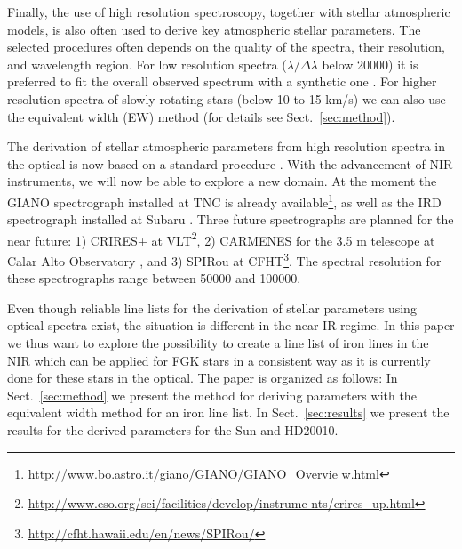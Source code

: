 \documentclass{aa}
\begin{document}
Finally, the use of high resolution spectroscopy, together with stellar
atmospheric models, is also often used to derive key atmospheric stellar
parameters. The selected procedures often depends on the quality of the
spectra, their resolution, and wavelength region. For low resolution
spectra ($\lambda/\Delta\lambda$ below 20000) it is preferred to
fit the overall observed spectrum with a synthetic one \citep[see
e.g.][]{Recio2006}. For higher resolution spectra of slowly rotating
stars (below 10 to 15 \si{km/s}) we can also use the equivalent width (EW)
method (for details see Sect.~\ref{sec:method}).

The derivation of stellar atmospheric parameters from high resolution spectra in the
optical is now based on a standard procedure \citep[see e.g.][]{Valenti2005,Sousa2008a}. With the
advancement of NIR instruments, we will now be able to explore a new
domain. At the moment the GIANO spectrograph installed at TNC is already
available\footnote{\url{http://www.bo.astro.it/giano/GIANO/GIANO_Overvie
w.html}}, as well as the IRD spectrograph installed
at Subaru \citep{IRD}. Three future spectrographs
are planned for the near future: 1) CRIRES+ at
VLT\footnote{\url{http://www.eso.org/sci/facilities/develop/instrume
nts/crires_up.html}}, 2) CARMENES for the 3.5 m telescope at
Calar Alto Observatory \citep{CARMENES}, and 3) SPIRou at
CFHT\footnote{\url{http://cfht.hawaii.edu/en/news/SPIRou/}}. The
spectral resolution for these spectrographs range between 50000 and
100000.

Even though reliable line lists for the derivation of stellar
parameters using optical spectra exist, the situation is different
in the near-IR regime. In this paper we thus want to explore the
possibility to create a line list of iron lines in the NIR which
can be applied for FGK stars in a consistent way as it is currently
done for these stars in the optical. The paper is organized as
follows: In Sect.~\ref{sec:method} we present the method for deriving
parameters with the equivalent width method for an iron line list.
In Sect.~\ref{sec:results} we present the results for the derived
parameters for the Sun and HD20010.
\end{document}
